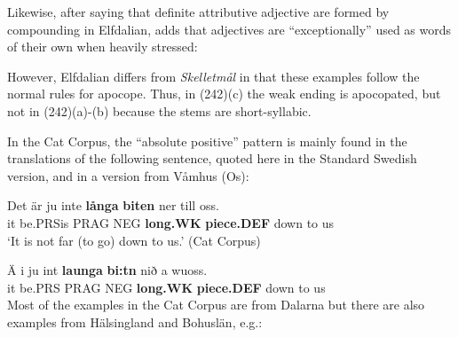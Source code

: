 Likewise, after saying that definite attributive adjective are formed by compounding in Elfdalian, \citet[53]{Levander1909} adds that adjectives are “exceptionally” used as words of their own when heavily stressed:


\ea\label{}


\z 
\z 

However, Elfdalian differs from \textit{Skelletmål} in that these examples follow the normal rules for apocope. Thus, in (242)(c) the weak ending is apocopated, but not in (242)(a){}-(b) because the stems are short-syllabic.


In the Cat Corpus, the “absolute positive” pattern is mainly found in the translations of the following sentence, quoted here in the Standard Swedish version, and in a version from Våmhus (Os):


\ea\label{}
\gll Det  är  ju  inte  \textbf{långa}\textbf{  biten} ner  till  oss.\\
it  be.PRSis  PRAG  NEG  \textbf{long.WK} \textbf{piece.DEF} down  to  us\\
\glt ‘It is not far (to go) down to us.’ (Cat Corpus)
\z

\ea\label{}
\gll Ä  i  ju  int  \textbf{launga} \textbf{bi:tn} nið  a  wuoss.\\
it  be.PRS  PRAG  NEG  \textbf{long.WK} \textbf{piece.DEF} down  to  us\\
\z
Most of the examples in the Cat Corpus are from Dalarna but there are also examples from Hälsingland and Bohuslän, e.g.:


